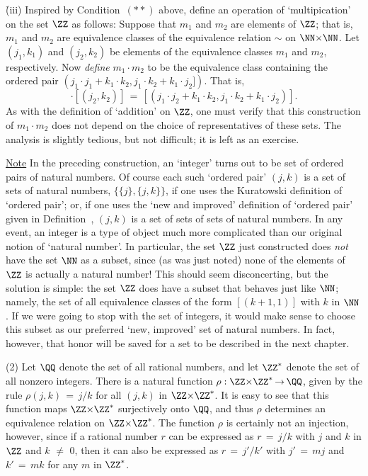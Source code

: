 {{{        \h (iii) Inspired by Condition~$({\ast}{\ast})$ above, define an operation of `multipication' on the set ${\ZZ}$ as follows:
    Suppose that $m_{1}$ and $m_{2}$ are elements of ${\ZZ}$; that is, $m_{1}$ and $m_{2}$ are equivalence classes of the equivalence relation $\sim$ on ${\NN}{\times}{\NN}$.
    Let $(j_{1},k_{1})$ and $(j_{2},k_{2})$ be elements of the equivalence classes $m_{1}$ and $m_{2}$, respectively.
    Now {\em define} $m_{1}{\cdot}m_{2}$ to be the equivalence class containing the ordered pair $(j_{1}{\cdot}j_{1} + k_{1}{\cdot}k_{2}, j_{1}{\cdot}k_{2}+k_{1}{\cdot}j_{2}])$.
    That is,
        \begin{displaymath}
        [(j_{1},k_{1})] {\cdot} [(j_{2},k_{2})] \,=\, [(j_{1}{\cdot}j_{2} + k_{1}{\cdot}k_{2}, j_{1}{\cdot}k_{2} + k_{1}{\cdot}j_{2})].
        \end{displaymath}
    As with the definition of `addition' on ${\ZZ}$, one must verify that this construction of $m_{1}{\cdot}m_{2}$ does not depend on the choice of representatives of these sets.
    The analysis is slightly tedious, but not difficult; it is left as an exercise.

        \underline{Note} In the preceding construction, an `integer' turns out to be set of ordered pairs of natural numbers.
    Of course each such `ordered pair' $(j,k)$ is a set of sets of natural numbers, $\{\{j\},\{j,k\}\}$, if one uses the Kuratowski definition of `ordered pair';
    or, if one uses the `new and improved' definition of `ordered pair' given in Definition~,
    $(j,k)$ is a set of sets of sets of natural numbers.
    In any event, an integer is a  type of object much more complicated than our original notion of `natural number'.
    In particular, the set ${\ZZ}$ just constructed does {\em not} have the set ${\NN}$ as a subset, since (as was just noted) none of the elements of ${\ZZ}$ is actually a natural number!
    This  should  seem  disconcerting, but the solution is simple:  the set ${\ZZ}$ does have a subset that behaves just like ${\NN}$;
    namely, the set of all equivalence classes of the form $[(k+1,1)]$ with $k$ in ${\NN}$.
    If we were going to stop with the set of integers, it would make sense to choose this subset as our preferred `new, improved' set of natural numbers.
    In fact, however, that honor will be saved for a set to be described in the next chapter.

\V

        (2) Let ${\QQ}$ denote the set of all rational numbers, and let ${\ZZ}^{*}$ denote the set of all nonzero integers.
    There is a natural function ${\rho}:{\ZZ}{\times}{\ZZ}^{*} \,{\rightarrow}\, {\QQ}$,
    given by the rule ${\rho}(j,k) \,=\, j/k$ for all $(j,k)$ in ${\ZZ}{\times}{\ZZ}^{*}$.
    It is easy to see that this function maps ${\ZZ}{\times}{\ZZ}^{*}$ surjectively onto ${\QQ}$,
    and thus ${\rho}$ determines an equivalence relation on ${\ZZ}{\times}{\ZZ}^{*}$.
    The function ${\rho}$ is certainly not an injection, however, since if a rational number $r$ can be expressed as $r \,=\, j/k$ with $j$ and $k$ in ${\ZZ}$ and $k \,\,{\neq}\,\, 0$,
    then it can also be expressed as $r \,=\, j'/k'$ with $j' \,=\, mj$ and $k' \,=\, mk$ for any $m$ in ${\ZZ}^{*}$.

}}}
